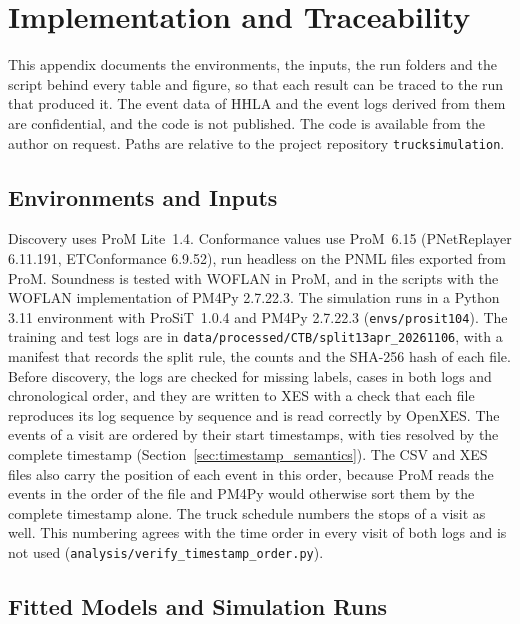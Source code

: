 \chapter{Implementation and Traceability}
\label{app:model_inspection}

This appendix documents the environments, the inputs, the run folders and the script
behind every table and figure, so that each result can be traced to the run that
produced it. The event data of HHLA and the event logs derived from them are
confidential, and the code is not published.
The code is available from the author on request. Paths are relative to the project
repository \texttt{trucksimulation}.

\section{Environments and Inputs}

Discovery uses ProM Lite~1.4. Conformance values use ProM~6.15 (PNetReplayer
6.11.191, ETConformance 6.9.52), run headless on the PNML files exported from
ProM. Soundness is tested with WOFLAN in ProM, and in the scripts with the WOFLAN
implementation of PM4Py 2.7.22.3. The
simulation runs in a Python 3.11 environment with ProSiT~1.0.4 and PM4Py 2.7.22.3
(\nolinkurl{envs/prosit104}). The training and test logs are in
\nolinkurl{data/processed/CTB/split13apr_20261106}, with a manifest that records the
split rule, the counts and the SHA-256 hash of each file. Before discovery, the
logs are checked for missing labels, cases in both logs and chronological order,
and they are written to XES with a check that each file reproduces its log
sequence by sequence and is read correctly by OpenXES. The events of a visit are
ordered by their start timestamps, with ties resolved by the complete timestamp
(Section~\ref{sec:timestamp_semantics}). The CSV and XES files also carry the
position of each event in this order, because ProM reads the events in the order
of the file and PM4Py would otherwise sort them by the complete timestamp alone.
The truck schedule numbers the stops of a visit as well. This numbering agrees
with the time order in every visit of both logs and is not used
(\nolinkurl{analysis/verify_timestamp_order.py}).

\section{Fitted Models and Simulation Runs}

